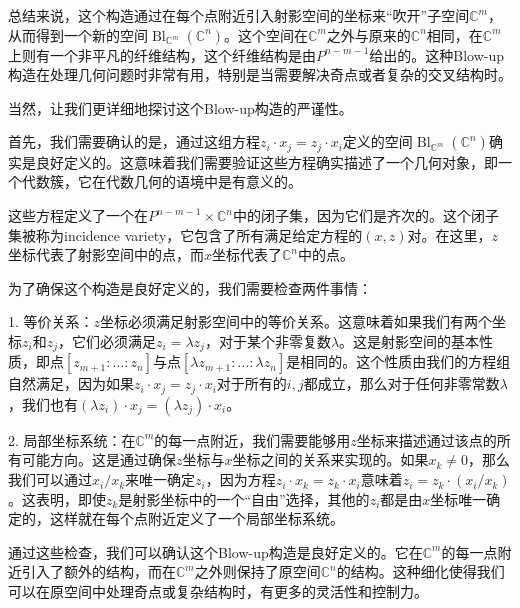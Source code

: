 总结来说，这个构造通过在每个点附近引入射影空间的坐标来“吹开”子空间$\mathbb{C}^m$，从而得到一个新的空间$\operatorname{Bl}_{\mathbb{C}^m}(\mathbb{C}^n)$。这个空间在$\mathbb{C}^m$之外与原来的$\mathbb{C}^n$相同，在$\mathbb{C}^m$上则有一个非平凡的纤维结构，这个纤维结构是由$P^{n-m-1}$给出的。这种Blow-up构造在处理几何问题时非常有用，特别是当需要解决奇点或者复杂的交叉结构时。

当然，让我们更详细地探讨这个Blow-up构造的严谨性。

首先，我们需要确认的是，通过这组方程$z_i \cdot x_j = z_j \cdot x_i$定义的空间$\operatorname{Bl}_{\mathbb{C}^m}(\mathbb{C}^n)$确实是良好定义的。这意味着我们需要验证这些方程确实描述了一个几何对象，即一个代数簇，它在代数几何的语境中是有意义的。

这些方程定义了一个在$P^{n-m-1} \times \mathbb{C}^n$中的闭子集，因为它们是齐次的。这个闭子集被称为incidence variety，它包含了所有满足给定方程的$(x,z)$对。在这里，$z$坐标代表了射影空间中的点，而$x$坐标代表了$\mathbb{C}^n$中的点。

为了确保这个构造是良好定义的，我们需要检查两件事情：

1. 等价关系：$z$坐标必须满足射影空间中的等价关系。这意味着如果我们有两个坐标$z_i$和$z_j$，它们必须满足$z_i = \lambda z_j$，对于某个非零复数$\lambda$。这是射影空间的基本性质，即点$[z_{m+1} : \ldots : z_n]$与点$[\lambda z_{m+1} : \ldots : \lambda z_n]$是相同的。这个性质由我们的方程组自然满足，因为如果$z_i \cdot x_j = z_j \cdot x_i$对于所有的$i,j$都成立，那么对于任何非零常数$\lambda$，我们也有$(\lambda z_i) \cdot x_j = (\lambda z_j) \cdot x_i$。

2. 局部坐标系统：在$\mathbb{C}^m$的每一点附近，我们需要能够用$z$坐标来描述通过该点的所有可能方向。这是通过确保$z$坐标与$x$坐标之间的关系来实现的。如果$x_k \neq 0$，那么我们可以通过$x_i/x_k$来唯一确定$z_i$，因为方程$z_i \cdot x_k = z_k \cdot x_i$意味着$z_i = z_k \cdot (x_i/x_k)$。这表明，即使$z_k$是射影坐标中的一个“自由”选择，其他的$z_i$都是由$x$坐标唯一确定的，这样就在每个点附近定义了一个局部坐标系统。

通过这些检查，我们可以确认这个Blow-up构造是良好定义的。它在$\mathbb{C}^m$的每一点附近引入了额外的结构，而在$\mathbb{C}^m$之外则保持了原空间$\mathbb{C}^n$的结构。这种细化使得我们可以在原空间中处理奇点或复杂结构时，有更多的灵活性和控制力。

